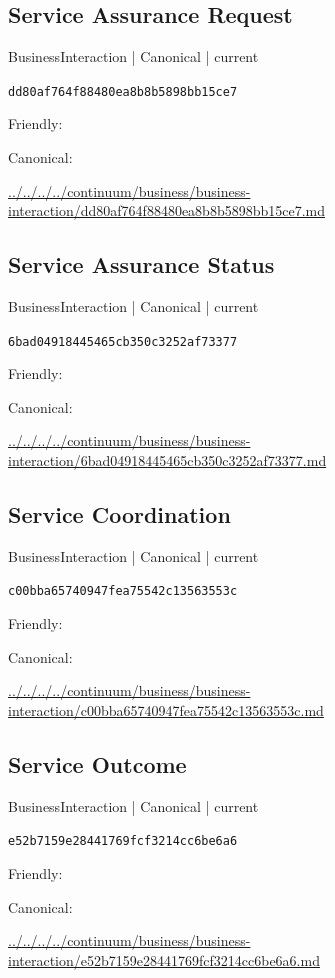 \documentclass[10pt,a4paper]{article}
\begin{document}
\subsection*{Service Assurance Request}
{\small BusinessInteraction | Canonical | current}\par
\texttt{dd80af764f88480ea8b8b5898bb15ce7}\par
Friendly: \par
Canonical: \par
{\footnotesize\url{../../../../continuum/business/business-interaction/dd80af764f88480ea8b8b5898bb15ce7.md}}\par
\subsection*{Service Assurance Status}
{\small BusinessInteraction | Canonical | current}\par
\texttt{6bad04918445465cb350c3252af73377}\par
Friendly: \par
Canonical: \par
{\footnotesize\url{../../../../continuum/business/business-interaction/6bad04918445465cb350c3252af73377.md}}\par
\subsection*{Service Coordination}
{\small BusinessInteraction | Canonical | current}\par
\texttt{c00bba65740947fea75542c13563553c}\par
Friendly: \par
Canonical: \par
{\footnotesize\url{../../../../continuum/business/business-interaction/c00bba65740947fea75542c13563553c.md}}\par
\subsection*{Service Outcome}
{\small BusinessInteraction | Canonical | current}\par
\texttt{e52b7159e28441769fcf3214cc6be6a6}\par
Friendly: \par
Canonical: \par
{\footnotesize\url{../../../../continuum/business/business-interaction/e52b7159e28441769fcf3214cc6be6a6.md}}\par
\end{document}
